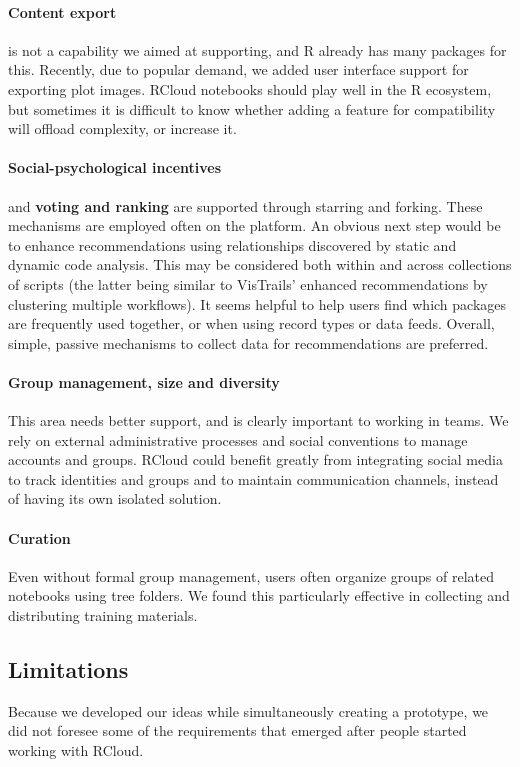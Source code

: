 \paragraph*{Content export} is not a capability we aimed at supporting,
and R already has many packages for this. Recently, due to popular
demand, we added user interface support for exporting plot images.
RCloud notebooks should play well in the R ecosystem,
but sometimes it is difficult to know whether adding
a feature for compatibility will offload complexity, or increase it.

\paragraph*{Social-psychological incentives} and {\bf voting and ranking} are
supported through starring and forking. These mechanisms are employed often
on the platform. An obvious next step would be to enhance recommendations
using relationships discovered by static and dynamic code analysis. This
may be considered both within and across collections of scripts (the latter
being similar to VisTrails' enhanced recommendations by clustering multiple
workflows). It seems helpful to help users find which packages are frequently
used together, or when using record types or data feeds.
Overall, simple, passive mechanisms to collect data for recommendations are preferred.

\paragraph*{Group management, size and diversity} This area needs better
support, and is clearly important to working in teams.
We rely on external administrative processes and social conventions
to manage accounts and groups. RCloud could benefit greatly from
integrating social media to track identities and groups and to maintain
communication channels, instead of having its own isolated solution.

\paragraph*{Curation} Even without formal group management, users often
organize groups of related notebooks using tree folders.
We found this particularly effective in collecting and distributing
training materials.

\subsection{Limitations}
Because we developed our ideas while simultaneously creating a prototype,
we did not foresee some of the requirements that emerged after
people started working with RCloud.

